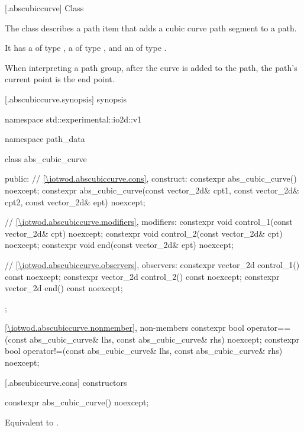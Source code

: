  [\iotwod.abscubiccurve] {Class }

\pnum
{}%
The class  describes a path item that adds a cubic \bezierlocal curve path segment to a path.

\pnum
It has a  of type , a  of type , and an  of type .

\pnum
When interpreting a path group, after the curve is added to the path, the path's current point is the end point.

 [\iotwod.abscubiccurve.synopsis] { synopsis}

\begin{codeblock}
namespace std::experimental::io2d::v1 {
  namespace path_data {
    class abs_cubic_curve {
    public:
      // \ref{\iotwod.abscubiccurve.cons}, construct:
      constexpr abs_cubic_curve() noexcept;
      constexpr abs_cubic_curve(const vector_2d& cpt1, const vector_2d& cpt2,
        const vector_2d& ept) noexcept;

      // \ref{\iotwod.abscubiccurve.modifiers}, modifiers:
      constexpr void control_1(const vector_2d& cpt) noexcept;
      constexpr void control_2(const vector_2d& cpt) noexcept;
      constexpr void end(const vector_2d& ept) noexcept;

      // \ref{\iotwod.abscubiccurve.observers}, observers:
      constexpr vector_2d control_1() const noexcept;
      constexpr vector_2d control_2() const noexcept;
      constexpr vector_2d end() const noexcept;
    };
    
    \ref{\iotwod.abscubiccurve.nonmember}, non-members
    constexpr bool operator==(const abs_cubic_curve& lhs,
      const abs_cubic_curve& rhs) noexcept;
    constexpr bool operator!=(const abs_cubic_curve& lhs,
      const abs_cubic_curve& rhs) noexcept;
  }
}
\end{codeblock}

 [\iotwod.abscubiccurve.cons] { constructors}

%
\begin{itemdecl}
constexpr abs_cubic_curve() noexcept;
\end{itemdecl}
\begin{itemdescr}
\pnum
\effects
Equivalent to .
\end{itemdescr}

